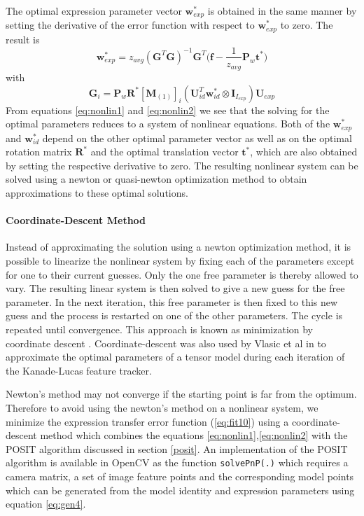 \documentclass[11pt,a4paper]{report}
\begin{document}
The optimal expression parameter vector $\mathbf{w}^*_{exp}$ is obtained in the
same manner by setting the derivative of the error function with respect to
$\mathbf{w}^*_{exp}$ to zero. The result is 
\begin{equation}\label{eq:nonlin2}
\mathbf{w}^*_{exp} = z_{avg}(\mathbf{G}^T\mathbf{G})^{-1}\mathbf{G}^T\bigl(\mathbf{f} - \frac{1}{z_{avg}}\mathbf{P}_w\mathbf{t}^*\bigr)
\end{equation}
with 
\begin{equation}\label{eq:G}
\mathbf{G}_i =
\mathbf{P}_w\mathbf{R}^*[\mathbf{M}_{(1)}]_{i}(\mathbf{U}_{id}^T\mathbf{w}^*_{id}
\otimes \mathbf{I}_{I_{exp}})\mathbf{U}_{exp}
\end{equation}
From equations \ref{eq:nonlin1} and \ref{eq:nonlin2} we see that the solving for
the optimal parameters reduces to a system of nonlinear equations. Both of the
$\mathbf{w}^*_{exp}$ and $\mathbf{w}^*_{id}$ depend on the other optimal parameter vector as
well as on the optimal rotation matrix $\mathbf{R}^*$ and the optimal translation
vector $\mathbf{t}^*$, which are also obtained by setting the respective
derivative to zero. The resulting nonlinear system can be solved using a newton or
quasi-newton optimization method to obtain approximations to these optimal solutions.

\paragraph{Coordinate-Descent Method}
Instead of approximating the solution using a newton optimization method, it is
possible to linearize the nonlinear system by fixing each of the parameters
except for one to their current guesses. Only the one free parameter is thereby
allowed to vary. The resulting linear system is then solved
to give a new guess for the free parameter. In the next iteration, this free parameter is then fixed to
this new guess and the process is restarted on one of the other parameters. The cycle
is repeated until convergence. This approach is known as minimization by coordinate
descent \cite{Press1992}. Coordinate-descent was also used by Vlasic et al in \cite{faceTransfer05}
to approximate the optimal parameters of a tensor model during each iteration of
the Kanade-Lucas feature tracker.

Newton's method may not converge if the starting point is far from the
optimum. Therefore to avoid using the newton's method on a nonlinear system, we
minimize the expression transfer error function (\ref{eq:fit10}) using
a coordinate-descent method which combines the equations
\ref{eq:nonlin1},\ref{eq:nonlin2} with the POSIT algorithm discussed in section
\ref{posit}. An implementation of the POSIT algorithm is available in OpenCV as
the function \texttt{solvePnP(.)} which requires a camera matrix, a set of image
feature points and the corresponding model points which can be generated from
the model identity and expression parameters using equation \ref{eq:gen4}.
\end{document}
